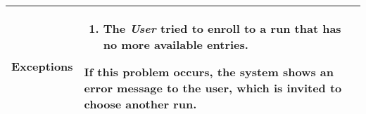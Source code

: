 \begin{table}[H]
\begin{tabular}{|p{3.5cm}|p{10.3cm}|}
    \hline
    \textbf{\large{Exceptions}} 		& \begin{enumerate}[leftmargin=0.5cm]
                                          	\item The \emph{User} tried to enroll to a run that has no more available entries.
                                          \end{enumerate}
    										If this problem occurs, the system shows an error message to the user, which is invited to choose another run.\\
    
    \hline
    
    
    \end{tabular}
	
\end{table}